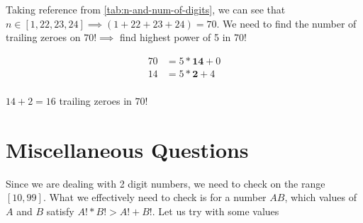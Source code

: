 
Taking reference from \ref{tab:n-and-num-of-digits}, we can see that $n \in [1,22,23,24] \implies (1+22+23+24) = 70$. We need to find the number of trailing zeroes on $70! \implies$ find highest power of 5 in 70!

\begin{align*}
    70 &= 5 * \textbf{14} + 0 \\
    14 &= 5 * \textbf{2} + 4 \\
\end{align*}

$14 + 2 = 16$ trailing zeroes in $70!$

\newpage
\section{Miscellaneous Questions}


Since we are dealing with 2 digit numbers, we need to check on the range $[10,99]$. What we effectively need to check is for a number $AB$, which values of $A$ and $B$ satisfy $A! * B! > A! + B!$. Let us try with some values

